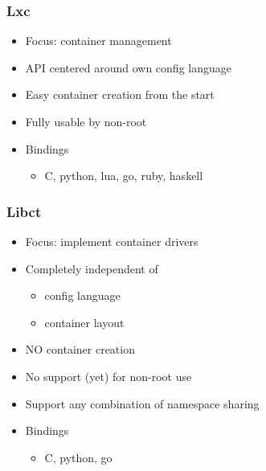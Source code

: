 \documentclass{beamer}
\begin{document}
\begin{frame}
\frametitle{Lxc}
\begin{itemize}
\item Focus: container management
\item API centered around own config language
\item Easy container creation from the start
\item Fully usable by non-root
\item Bindings
  \begin{itemize}
  \item C, python, lua, go, ruby, haskell
  \end{itemize}
\end{itemize}
\end{frame}

\begin{frame}
\frametitle{Libct}
\begin{itemize}
\item Focus: implement container drivers
\item Completely independent of
  \begin{itemize}
  \item config language
  \item container layout
  \end{itemize}
\item NO container creation
\item No support (yet) for non-root use
\item Support any combination of namespace sharing
\item Bindings
  \begin{itemize}
  \item C, python, go
  \end{itemize}
\end{itemize}
\end{frame}


\end{document}
